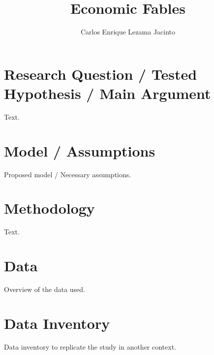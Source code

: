 \documentclass[9pt,twocolumn,twoside,]{pnas-new}
\title{Economic Fables}
\author[]{Carlos Enrique Lezama Jacinto}
\affil[]{Instituto Tecnológico Autónomo de México}
\begin{document}
\verticaladjustment{-2pt}



\maketitle
\thispagestyle{firststyle}


\acknow{}

\hypertarget{research-question-tested-hypothesis-main-argument}{%
\section*{Research Question / Tested Hypothesis / Main
Argument}\label{research-question-tested-hypothesis-main-argument}}

Text.

\hypertarget{model-assumptions}{%
\section*{Model / Assumptions}\label{model-assumptions}}

Proposed model / Necessary assumptions.

\hypertarget{methodology}{%
\section*{Methodology}\label{methodology}}

Text.

\hypertarget{data}{%
\section*{Data}\label{data}}

Overview of the data used.

\hypertarget{data-inventory}{%
\section*{Data Inventory}\label{data-inventory}}

Data inventory to replicate the study in another context.

\showmatmethods
\showacknow
\pnasbreak



% 
\end{document}
